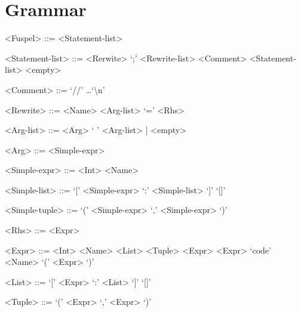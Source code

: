 \section{Grammar}
\label{sec:grammar}

\setlength{\grammarparsep}{4pt}
\setlength{\grammarindent}{10em}
\begin{grammar}
	<Fuspel> ::= <Statement-list>

	<Statement-list> ::= <Rerwite> `;' <Rewrite-list>
		\alt <Comment> <Statement-list>
		\alt <empty>

	<Comment> ::= `//' \dots `\textbackslash n'

	<Rewrite> ::= <Name> <Arg-list> `=' <Rhs>

	<Arg-list> ::= <Arg> ` ' <Arg-list> | <empty>

	<Arg> ::= <Simple-expr>

	<Simple-expr> ::= <Int>
		\alt <Simple-list>
		\alt <Simple-tuple>

	<Simple-list> ::= `[' <Simple-expr> `:' <Simple-list> `]'
		\alt `[]'
	
	<Simple-tuple> ::= `(' <Simple-expr> `,' <Simple-expr> `)'

	<Rhs> ::= <Expr>

	<Expr> ::= <Int>
		\alt <Tuple>
		 <Expr>
		\alt `code' <Name>
		\alt `(' <Expr> `)'

	<List> ::= `[' <Expr> `:' <List> `]'
		\alt `[]'
	
	<Tuple> ::= `(' <Expr> `,' <Expr> `)'
\end{grammar}
